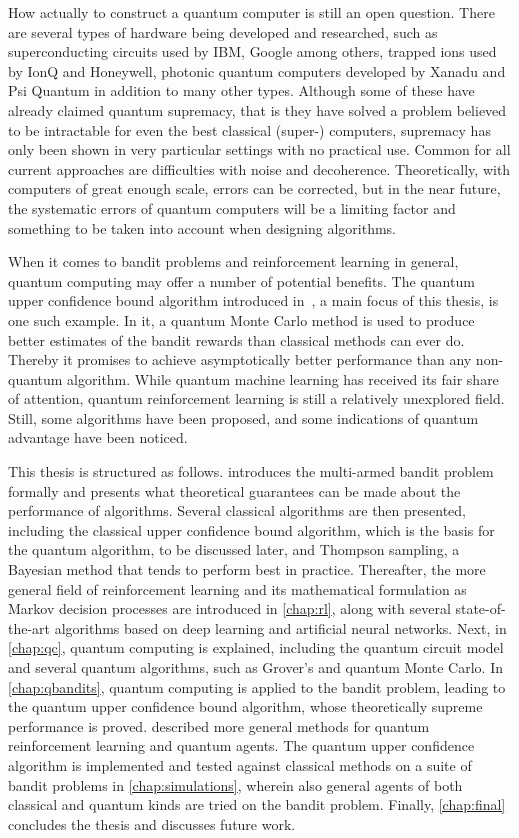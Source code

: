 How actually to construct a quantum computer is still an open question.
There are several types of hardware being developed and researched, such as superconducting circuits used by IBM, Google among others, trapped ions used by IonQ and Honeywell, photonic quantum computers developed by Xanadu and Psi Quantum in addition to many other types.
Although some of these have already claimed quantum supremacy, that is they have solved a problem believed to be intractable for even the best classical (super-) computers, supremacy has only been shown in very particular settings with no practical use.
Common for all current approaches are difficulties with noise and decoherence.
Theoretically, with computers of great enough scale, errors can be corrected, but in the near future, the systematic errors of quantum computers will be a limiting factor and something to be taken into account when designing algorithms.

When it comes to bandit problems and reinforcement learning in general, quantum computing may offer a number of potential benefits.
The quantum upper confidence bound algorithm introduced in~\autocite{wan2022}, a main focus of this thesis, is one such example.
In it, a quantum Monte Carlo method is used to produce better estimates of the bandit rewards than classical methods can ever do.
Thereby it promises to achieve asymptotically better performance than any non-quantum algorithm.
While quantum machine learning has received its fair share of attention, quantum reinforcement learning is still a relatively unexplored field.
Still, some algorithms have been proposed, and some indications of quantum advantage have been noticed.

This thesis is structured as follows.
 introduces the multi-armed bandit problem formally and presents what theoretical guarantees can be made about the performance of algorithms.
Several classical algorithms are then presented, including the classical upper confidence bound algorithm, which is the basis for the quantum algorithm, to be discussed later, and Thompson sampling, a Bayesian method that tends to perform best in practice.
Thereafter, the more general field of reinforcement learning and its mathematical formulation as Markov decision processes are introduced in \cref{chap:rl}, along with several state-of-the-art algorithms based on deep learning and artificial neural networks.
Next, in \cref{chap:qc}, quantum computing is explained, including the quantum circuit model and several quantum algorithms, such as Grover's and quantum Monte Carlo.
In \cref{chap:qbandits}, quantum computing is applied to the bandit problem, leading to the quantum upper confidence bound algorithm, whose theoretically supreme performance is proved.
 described more general methods for quantum reinforcement learning and quantum agents.
The quantum upper confidence algorithm is implemented and tested against classical methods on a suite of bandit problems in \cref{chap:simulations}, wherein also general agents of both classical and quantum kinds are tried on the bandit problem.
Finally, \cref{chap:final} concludes the thesis and discusses future work.